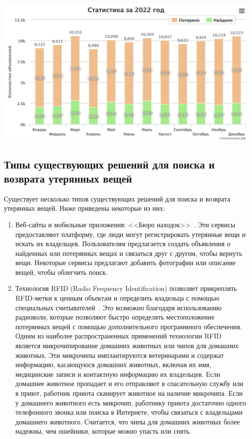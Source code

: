 \documentclass{mirea-article}
\newenvironment{Figure}
{\par\medskip\noindent\minipage{\linewidth}}
{\endminipage\par\medskip}
\begin{document}
\begin{multicols}{2}
		\begin{Figure}
			\centering
			\includegraphics[width=\textwidth]{../images/chart2022}
			\label{fig:chart2022}
		\end{Figure}
		
		\subsection*{Типы существующих решений для поиска и возврата утерянных вещей}
		
		Существует несколько типов существующих решений для поиска и возврата утерянных вещей. Ниже приведены некоторые из них:
		\begin{enumerate}
			\item Веб-сайты и мобильные приложения: <<Бюро находок>>~\cite{bib:stol_nahodok,bib:pona}. Эти сервисы предоставляют платформу, где люди могут регистрировать утерянные вещи и искать их владельцев. Пользователям предлагается создать объявления о найденных или потерянных вещах и связаться друг с другом, чтобы вернуть вещи. Некоторые сервисы предлагают добавить фотографии или описание вещей, чтобы облегчить поиск. 
			
			\item Технология RFID (Radio Frequency Identification) позволяет прикреплять RFID-метки к ценным объектам и определить владельца с помощью специальных считывателей~\cite{bib:investopedia_rfid,bib:airtag}. Это возможно благодаря использованию радиоволн, которые позволяют быстро определять местоположение потерянных вещей с помощью дополнительного программного обеспечения. Одним из наиболее распространенных применений технологии RFID является микрочипирование домашних животных или чипов для домашних животных. Эти микрочипы имплантируются ветеринарами и содержат информацию, касающуюся домашних животных, включая их имя, медицинские записи и контактную информацию их владельцев. Если домашнее животное пропадает и его отправляют в спасательную службу или в приют, работник приюта сканирует животное на наличие микрочипа. Если у домашнего животного есть микрочип, работнику приюта достаточно одного телефонного звонка или поиска в Интернете, чтобы связаться с владельцами домашнего животного. Считается, что чипы для домашних животных более надежны, чем ошейники, которые можно упасть или снять.
			

\end{enumerate}
\end{multicols}
\end{document}
